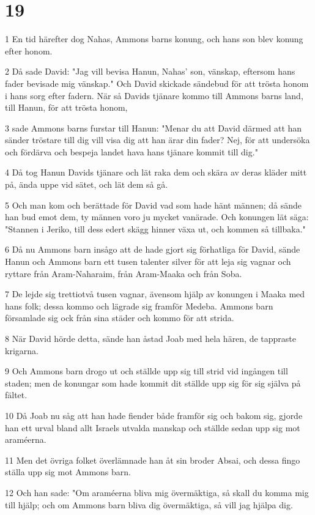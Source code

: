 \chapter{19}

\par 1 En tid härefter dog Nahas, Ammons barns konung, och hans son blev konung efter honom.
\par 2 Då sade David: "Jag vill bevisa Hanun, Nahas' son, vänskap, eftersom hans fader bevisade mig vänskap." Och David skickade sändebud för att trösta honom i hans sorg efter fadern. När så Davids tjänare kommo till Ammons barns land, till Hanun, för att trösta honom,
\par 3 sade Ammons barns furstar till Hanun: "Menar du att David därmed att han sänder tröstare till dig vill visa dig att han ärar din fader? Nej, för att undersöka och fördärva och bespeja landet hava hans tjänare kommit till dig."
\par 4 Då tog Hanun Davids tjänare och lät raka dem och skära av deras kläder mitt på, ända uppe vid sätet, och lät dem så gå.
\par 5 Och man kom och berättade för David vad som hade hänt männen; då sände han bud emot dem, ty männen voro ju mycket vanärade. Och konungen lät säga: "Stannen i Jeriko, till dess edert skägg hinner växa ut, och kommen så tillbaka."
\par 6 Då nu Ammons barn insågo att de hade gjort sig förhatliga för David, sände Hanun och Ammons barn ett tusen talenter silver för att leja sig vagnar och ryttare från Aram-Naharaim, från Aram-Maaka och från Soba.
\par 7 De lejde sig trettiotvå tusen vagnar, ävensom hjälp av konungen i Maaka med hans folk; dessa kommo och lägrade sig framför Medeba. Ammons barn församlade sig ock från sina städer och kommo för att strida.
\par 8 När David hörde detta, sände han åstad Joab med hela hären, de tappraste krigarna.
\par 9 Och Ammons barn drogo ut och ställde upp sig till strid vid ingången till staden; men de konungar som hade kommit dit ställde upp sig för sig själva på fältet.
\par 10 Då Joab nu såg att han hade fiender både framför sig och bakom sig, gjorde han ett urval bland allt Israels utvalda manskap och ställde sedan upp sig mot araméerna.
\par 11 Men det övriga folket överlämnade han åt sin broder Absai, och dessa fingo ställa upp sig mot Ammons barn.
\par 12 Och han sade: "Om araméerna bliva mig övermäktiga, så skall du komma mig till hjälp; och om Ammons barn bliva dig övermäktiga, så vill jag hjälpa dig.
